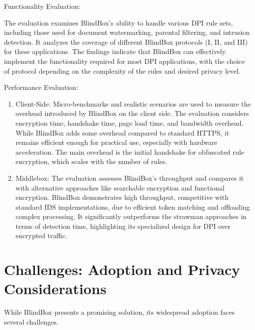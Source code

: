 \documentclass[conference]{IEEEtran}
\begin{document}
Functionality Evaluation:

The evaluation examines BlindBox's ability to handle various DPI rule sets, including those used for document watermarking, parental filtering, and intrusion detection. It analyzes the coverage of different BlindBox protocols (I, II, and III) for these applications. The findings indicate that BlindBox can effectively implement the functionality required for most DPI applications, with the choice of protocol depending on the complexity of the rules and desired privacy level.

Performance Evaluation:

\begin{enumerate}
    \item Client-Side: Micro-benchmarks and realistic scenarios are used to measure the overhead introduced by BlindBox on the client side. The evaluation considers encryption time, handshake time, page load time, and bandwidth overhead. While BlindBox adds some overhead compared to standard HTTPS, it remains efficient enough for practical use, especially with hardware acceleration. The main overhead is the initial handshake for obfuscated rule encryption, which scales with the number of rules.

    \item Middlebox: The evaluation assesses BlindBox's throughput and compares it with alternative approaches like searchable encryption and functional encryption. BlindBox demonstrates high throughput, competitive with standard IDS implementations, due to efficient token matching and offloading complex processing. It significantly outperforms the strawman approaches in terms of detection time, highlighting its specialized design for DPI over encrypted traffic.
\end{enumerate}

\section{Challenges: Adoption and Privacy Considerations}

While BlindBox presents a promising solution, its widespread adoption faces several challenges.
\end{document}
